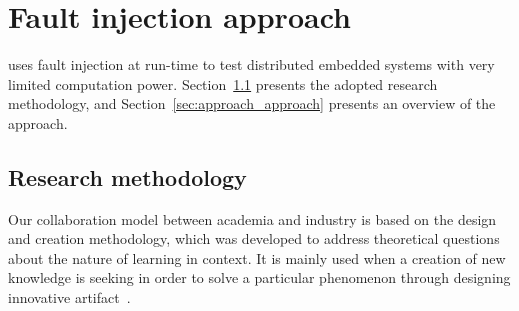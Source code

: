\section{Fault injection approach}\label{sec:approach}

\approach{} uses fault injection at run-time to test distributed embedded systems with very limited computation power. 
Section~\ref{sec:researchMeth} presents the adopted research methodology, and Section~\ref{sec:approach_approach} presents an overview of the \approach{} approach. 


\subsection{Research methodology}\label{sec:researchMeth}

Our collaboration model between academia and industry is based on the 
design and creation methodology, which was developed to address theoretical questions about the nature of learning
in context. It is mainly used when a creation of new knowledge is seeking in
order to solve a particular phenomenon through designing innovative artifact~\cite{ResMethod}.


